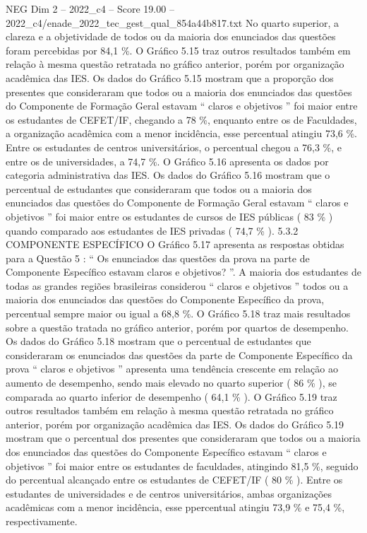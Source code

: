 \begin{textsample}{NEG Dim 2 – 2022\_c4 – Score 19.00 – 2022\_c4/enade\_2022\_tec\_gest\_qual\_854a44b817.txt}
No quarto superior, a clareza e a objetividade de todos ou da maioria dos enunciados das questões foram percebidas por 84,1 \%.
O Gráfico 5.15 traz outros resultados também em relação à mesma questão retratada no gráfico anterior, porém por organização acadêmica das IES.
Os dados do Gráfico 5.15 mostram que a proporção dos presentes que consideraram que todos ou a maioria dos enunciados das questões do Componente de Formação Geral estavam “ claros e objetivos ” foi maior entre os estudantes de CEFET/IF, chegando a 78 \%, enquanto entre os de Faculdades, a organização acadêmica com a menor incidência, esse percentual atingiu 73,6 \%.
Entre os estudantes de centros universitários, o percentual chegou a 76,3 \%, e entre os de universidades, a 74,7 \%.
O Gráfico 5.16 apresenta os dados por categoria administrativa das IES.
Os dados do Gráfico 5.16 mostram que o percentual de estudantes que consideraram que todos ou a maioria dos enunciados das questões do Componente de Formação Geral estavam “ claros e objetivos ” foi maior entre os estudantes de cursos de IES públicas ( 83 \% ) quando comparado aos estudantes de IES privadas ( 74,7 \% ). 5.3.2 COMPONENTE ESPECÍFICO O Gráfico 5.17 apresenta as respostas obtidas para a Questão 5 : “ Os enunciados das questões da prova na parte de Componente Específico estavam claros e objetivos? ”.
A maioria dos estudantes de todas as grandes regiões brasileiras considerou “ claros e objetivos ” todos ou a maioria dos enunciados das questões do Componente Específico da prova, percentual sempre maior ou igual a 68,8 \%.
O Gráfico 5.18 traz mais resultados sobre a questão tratada no gráfico anterior, porém por quartos de desempenho.
Os dados do Gráfico 5.18 mostram que o percentual de estudantes que consideraram os enunciados das questões da parte de Componente Específico da prova “ claros e objetivos ” apresenta uma tendência crescente em relação ao aumento de desempenho, sendo mais elevado no quarto superior ( 86 \% ), se comparada ao quarto inferior de desempenho ( 64,1 \% ).
O Gráfico 5.19 traz outros resultados também em relação à mesma questão retratada no gráfico anterior, porém por organização acadêmica das IES.
Os dados do Gráfico 5.19 mostram que o percentual dos presentes que consideraram que todos ou a maioria dos enunciados das questões do Componente Específico estavam “ claros e objetivos ” foi maior entre os estudantes de faculdades, atingindo 81,5 \%, seguido do percentual alcançado entre os estudantes de CEFET/IF ( 80 \% ).
Entre os estudantes de universidades e de centros universitários, ambas organizações acadêmicas com a menor incidência, esse ppercentual atingiu 73,9 \% e 75,4 \%, respectivamente.

\end{textsample}
